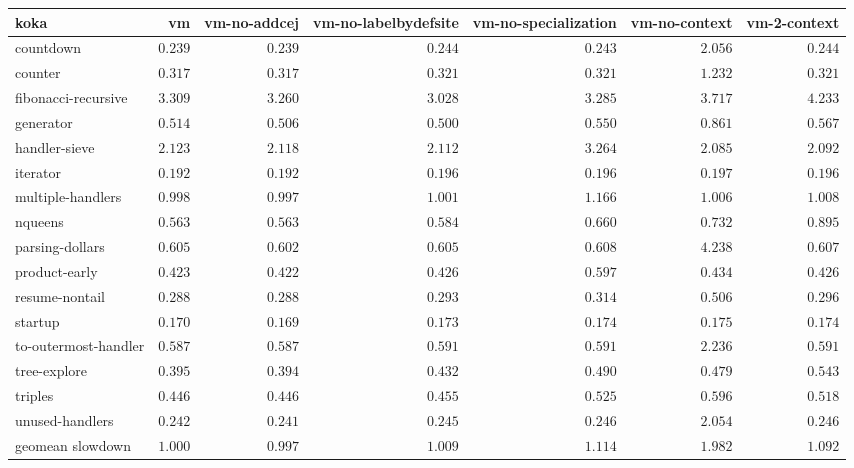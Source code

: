 \begin{tabular}{l r r r r r r}
\toprule koka & vm & vm-no-addcej & vm-no-labelbydefsite & vm-no-specialization & vm-no-context & vm-2-context \\
\midrule
countdown & $\mathbf{0.239}$ & $0.239$ & $0.244$ & $0.243$ & $2.056$ & $0.244$ \\
counter & $\mathbf{0.317}$ & $0.317$ & $0.321$ & $0.321$ & $1.232$ & $0.321$ \\
fibonacci-recursive & $3.309$ & $3.260$ & $\mathbf{3.028}$ & $3.285$ & $3.717$ & $4.233$ \\
generator & $0.514$ & $0.506$ & $\mathbf{0.500}$ & $0.550$ & $0.861$ & $0.567$ \\
handler-sieve & $2.123$ & $2.118$ & $2.112$ & $3.264$ & $\mathbf{2.085}$ & $2.092$ \\
iterator & $0.192$ & $\mathbf{0.192}$ & $0.196$ & $0.196$ & $0.197$ & $0.196$ \\
multiple-handlers & $0.998$ & $\mathbf{0.997}$ & $1.001$ & $1.166$ & $1.006$ & $1.008$ \\
nqueens & $0.563$ & $\mathbf{0.563}$ & $0.584$ & $0.660$ & $0.732$ & $0.895$ \\
parsing-dollars & $0.605$ & $\mathbf{0.602}$ & $0.605$ & $0.608$ & $4.238$ & $0.607$ \\
product-early & $0.423$ & $\mathbf{0.422}$ & $0.426$ & $0.597$ & $0.434$ & $0.426$ \\
resume-nontail & $0.288$ & $\mathbf{0.288}$ & $0.293$ & $0.314$ & $0.506$ & $0.296$ \\
startup & $0.170$ & $\mathbf{0.169}$ & $0.173$ & $0.174$ & $0.175$ & $0.174$ \\
to-outermost-handler & $\mathbf{0.587}$ & $0.587$ & $0.591$ & $0.591$ & $2.236$ & $0.591$ \\
tree-explore & $0.395$ & $\mathbf{0.394}$ & $0.432$ & $0.490$ & $0.479$ & $0.543$ \\
triples & $0.446$ & $\mathbf{0.446}$ & $0.455$ & $0.525$ & $0.596$ & $0.518$ \\
unused-handlers & $0.242$ & $\mathbf{0.241}$ & $0.245$ & $0.246$ & $2.054$ & $0.246$ \\
\midrule
 geomean slowdown & $1.000$ & $0.997$ & $1.009$ & $1.114$ & $1.982$ & $1.092$ \\
\bottomrule
\end{tabular}